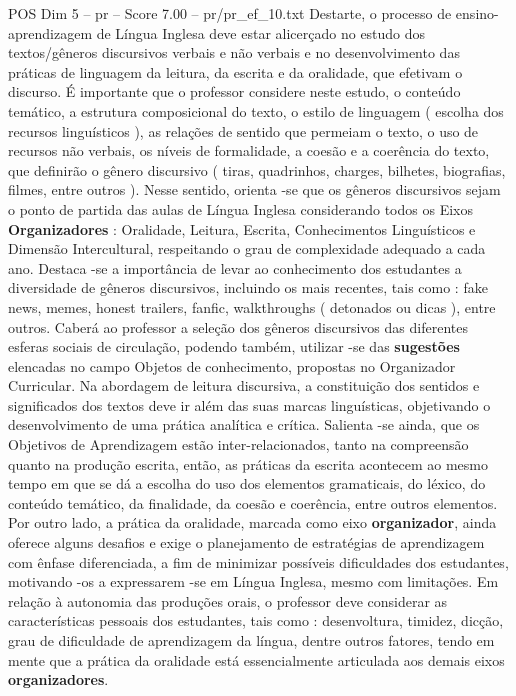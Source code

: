 \begin{textsample}{POS Dim 5 – pr – Score 7.00 – pr/pr\_ef\_10.txt}
Destarte, o processo de ensino-aprendizagem de Língua Inglesa deve estar alicerçado no estudo dos textos/gêneros discursivos verbais e não verbais e no desenvolvimento das práticas de linguagem da leitura, da escrita e da oralidade, que efetivam o discurso.
É importante que o professor considere neste estudo, o conteúdo temático, a estrutura composicional do texto, o estilo de linguagem ( escolha dos recursos linguísticos ), as relações de sentido que permeiam o texto, o uso de recursos não verbais, os níveis de formalidade, a coesão e a coerência do texto, que definirão o gênero discursivo ( tiras, quadrinhos, charges, bilhetes, biografias, filmes, entre outros ).
Nesse sentido, orienta -se que os gêneros discursivos sejam o ponto de partida das aulas de Língua Inglesa considerando todos os Eixos \textbf{Organizadores} : Oralidade, Leitura, Escrita, Conhecimentos Linguísticos e Dimensão Intercultural, respeitando o grau de complexidade adequado a cada ano.
Destaca -se a importância de levar ao conhecimento dos estudantes a diversidade de gêneros discursivos, incluindo os mais recentes, tais como : fake news, memes, honest trailers, fanfic, walkthroughs ( detonados ou dicas ), entre outros.
Caberá ao professor a seleção dos gêneros discursivos das diferentes esferas sociais de circulação, podendo também, utilizar -se das \textbf{sugestões} elencadas no campo Objetos de conhecimento, propostas no Organizador Curricular.
Na abordagem de leitura discursiva, a constituição dos sentidos e significados dos textos deve ir além das suas marcas linguísticas, objetivando o desenvolvimento de uma prática analítica e crítica.
Salienta -se ainda, que os Objetivos de Aprendizagem estão inter-relacionados, tanto na compreensão quanto na produção escrita, então, as práticas da escrita acontecem ao mesmo tempo em que se dá a escolha do uso dos elementos gramaticais, do léxico, do conteúdo temático, da finalidade, da coesão e coerência, entre outros elementos.
Por outro lado, a prática da oralidade, marcada como eixo \textbf{organizador}, ainda oferece alguns desafios e exige o planejamento de estratégias de aprendizagem com ênfase diferenciada, a fim de minimizar possíveis dificuldades dos estudantes, motivando -os a expressarem -se em Língua Inglesa, mesmo com limitações.
Em relação à autonomia das produções orais, o professor deve considerar as características pessoais dos estudantes, tais como : desenvoltura, timidez, dicção, grau de dificuldade de aprendizagem da língua, dentre outros fatores, tendo em mente que a prática da oralidade está essencialmente articulada aos demais eixos \textbf{organizadores}.

\end{textsample}
